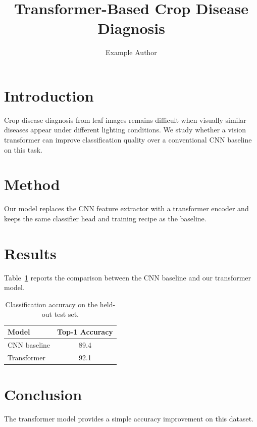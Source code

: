 \documentclass{article}
\title{Transformer-Based Crop Disease Diagnosis}
\author{Example Author}
\date{}
\begin{document}
\maketitle

\section{Introduction}
Crop disease diagnosis from leaf images remains difficult when visually similar diseases appear under different lighting conditions. We study whether a vision transformer can improve classification quality over a conventional CNN baseline on this task.

\section{Method}
Our model replaces the CNN feature extractor with a transformer encoder and keeps the same classifier head and training recipe as the baseline.

\section{Results}
Table~\ref{tab:main-results} reports the comparison between the CNN baseline and our transformer model.

\begin{table}[h]
\centering
\caption{Classification accuracy on the held-out test set.}
\label{tab:main-results}
\begin{tabular}{lc}
\toprule
Model & Top-1 Accuracy \\
\midrule
CNN baseline & 89.4 \\
Transformer & 92.1 \\
\bottomrule
\end{tabular}
\end{table}


\section{Conclusion}
The transformer model provides a simple accuracy improvement on this dataset.
\end{document}
